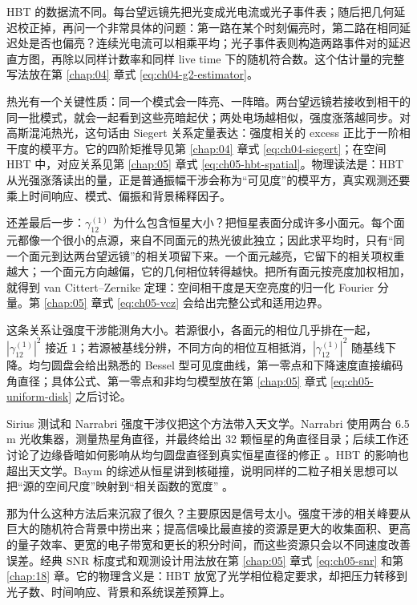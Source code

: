 HBT 的数据流不同。每台望远镜先把光变成光电流或光子事件表；随后把几何延迟校正掉，再问一个非常具体的问题：第一路在某个时刻偏亮时，第二路在相同延迟处是否也偏亮？连续光电流可以相乘平均；光子事件表则构造两路事件对的延迟直方图，再除以同样计数率和同样 live time 下的随机符合数。这个估计量的完整写法放在第 \ref{chap:04} 章式 \eqref{eq:ch04-g2-estimator}。

热光有一个关键性质：同一个模式会一阵亮、一阵暗。两台望远镜若接收到相干的同一批模式，就会一起看到这些亮暗起伏；两处电场越相似，强度涨落越同步。对高斯混沌热光，这句话由 Siegert 关系定量表达：强度相关的 excess 正比于一阶相干度的模平方。它的四阶矩推导见第 \ref{chap:04} 章式 \eqref{eq:ch04-siegert}；在空间 HBT 中，对应关系见第 \ref{chap:05} 章式 \eqref{eq:ch05-hbt-spatial}。物理读法是：HBT 从光强涨落读出的量，正是普通振幅干涉会称为“可见度”的模平方，真实观测还要乘上时间响应、模式、偏振和背景稀释因子。

还差最后一步：\(\gamma^{(1)}_{12}\) 为什么包含恒星大小？把恒星表面分成许多小面元。每个面元都像一个很小的点源，来自不同面元的热光彼此独立；因此求平均时，只有“同一个面元到达两台望远镜”的相关项留下来。一个面元越亮，它留下的相关项权重越大；一个面元方向越偏，它的几何相位转得越快。把所有面元按亮度加权相加，就得到 van Cittert--Zernike 定理：空间相干度是天空亮度的归一化 Fourier 分量。第 \ref{chap:05} 章式 \eqref{eq:ch05-vcz} 会给出完整公式和适用边界。

这条关系让强度干涉能测角大小。若源很小，各面元的相位几乎排在一起，\(|\gamma^{(1)}_{12}|^2\) 接近 1；若源被基线分辨，不同方向的相位互相抵消，\(|\gamma^{(1)}_{12}|^2\) 随基线下降。均匀圆盘会给出熟悉的 Bessel 型可见度曲线，第一零点和下降速度直接编码角直径；具体公式、第一零点和非均匀模型放在第 \ref{chap:05} 章式 \eqref{eq:ch05-uniform-disk} 之后讨论。

Sirius 测试和 Narrabri 强度干涉仪把这个方法带入天文学。Narrabri 使用两台 6.5 m 光收集器，测量热星角直径，并最终给出 32 颗恒星的角直径目录；后续工作还讨论了边缘昏暗如何影响从均匀圆盘直径到真实恒星直径的修正 \citep{1956Natur.178.1046H,1967MNRAS.137..375H,1967MNRAS.137..393H,1974MNRAS.167..121H,1974MNRAS.167..475H,1974iiia.book.....H}。HBT 的影响也超出天文学。Baym 的综述从恒星讲到核碰撞，说明同样的二粒子相关思想可以把“源的空间尺度”映射到“相关函数的宽度” \citep{1998AcPPB..29.1839B,1990RvMP...62..553B}。

那为什么这种方法后来沉寂了很久？主要原因是信号太小。强度干涉的相关峰要从巨大的随机符合背景中捞出来；提高信噪比最直接的资源是更大的收集面积、更高的量子效率、更宽的电子带宽和更长的积分时间，而这些资源只会以不同速度改善误差。经典 SNR 标度式和观测设计用法放在第 \ref{chap:05} 章式 \eqref{eq:ch05-snr} 和第 \ref{chap:18} 章。它的物理含义是：HBT 放宽了光学相位稳定要求，却把压力转移到光子数、时间响应、背景和系统误差预算上。


